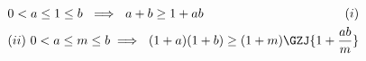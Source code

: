 \begin{gather*}
0<a\le1\le b \ \implies \ a+b\ge 1+ab\hfill{(i)} \\ 
(ii)\ 0<a\le m\le b \implies \ (1+a)(1+b) \ge (1+m)\GZJ{1+\frac{ab}{m}}\\
\end{gather*}
